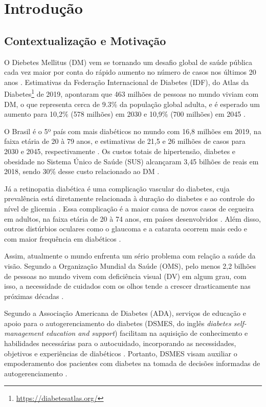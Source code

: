 \chapter{Introdução}

\section{Contextualização e Motivação}

O Diebetes Mellitus (DM) vem se tornando um desafio global de saúde pública cada vez maior por conta do rápido aumento no número de casos nos últimos
20 anos \cite{ADA2019}.
Estimativas da Federação Internacional de Diabetes (IDF), do Atlas da Diabetes\footnote{\url{https://diabetesatlas.org/}}
de 2019, apontaram que 463 milhões de pessoas no mundo viviam com DM, o que representa cerca de 9.3\% da população
global adulta, e é esperado um aumento para 10,2\% (578 milhões) em 2030 e 10,9\% (700 milhões) em 2045 \cite{SAEEDI2019107843}.

O Brasil é o 5º país com mais diabéticos no mundo com 16,8 milhões em 2019, na faixa etária de 20 à 79 anos, e estimativas
de 21,5 e 26 milhões de casos para 2030 e 2045, respectivamente \cite{SAEEDI2019107843}. Os custos totais de hipertensão, diabetes
e obesidade no Sistema Único de Saúde (SUS) alcançaram 3,45 bilhões de reais em 2018, sendo 30\% desse custo relacionado ao DM \cite{Nilson2020}.

Já a retinopatia diabética é uma complicação vascular do diabetes, cuja prevalência está diretamente relacionada à duração
do diabetes e ao controle do nível de glicemia \cite{Solomon412}. Essa complicação é a maior causa de novos casos de cegueira
em adultos, na faixa etária de 20 à 74 anos, em países desenvolvidos \cite{ADA2019}. Além disso, outros distúrbios oculares
como o glaucoma e a catarata ocorrem mais cedo e com maior frequência em diabéticos \cite{ADA2019}.

Assim, atualmente o mundo enfrenta um sério problema com relação a saúde da visão. Segundo a Organização Mundial da Saúde (OMS),
pelo menos 2,2 bilhões de pessoas no mundo vivem com deficiência visual (DV) em algum grau, com isso,
a necessidade de cuidados com os olhos tende a crescer drasticamente nas próximas décadas \cite{WHO2019}.

Segundo a Associação Americana de Diabetes (ADA), serviços de educação e apoio para o autogerenciamento do diabetes
(DSMES, do inglês \emph{diabetes self-management education and support}) facilitam na aquisição de conhecimento e habilidades
necessárias para o autocuidado, incorporando as necessidades, objetivos e experiências de diabéticos \cite{ADA2019}. Portanto, DSMES
visam auxiliar o empoderamento dos pacientes com diabetes na tomada de decisões informadas de autogerenciamento \cite{Marrero2013}.

